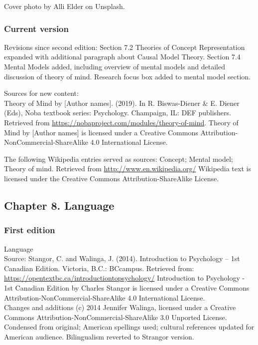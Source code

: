 \documentclass[
]{krantz}
\begin{document}
Cover photo by Alli Elder on Unsplash.

\subsubsection*{Current version}\label{current-version-2}


Revisions since second edition: Section 7.2 Theories of Concept Representation expanded with additional paragraph about Causal Model Theory. Section 7.4 Mental Models added, including overview of mental models and detailed discussion of theory of mind. Research focus box added to mental model section.

Sources for new content:\\
Theory of Mind by {[}Author names{]}. (2019). In R. Biswas-Diener \& E. Diener (Eds), Noba textbook series: Psychology. Champaign, IL: DEF publishers. Retrieved from \url{https://nobaproject.com/modules/theory-of-mind}.
Theory of Mind by {[}Author names{]} is licensed under a Creative Commons Attribution-NonCommercial-ShareAlike 4.0 International License.

The following Wikipedia entries served as sources: Concept; Mental model; Theory of mind. Retrieved from \url{http://www.en.wikipedia.org/}
Wikipedia text is licensed under the Creative Commons Attribution-ShareAlike License.

\subsection*{Chapter 8. Language}\label{chapter-8.-language}


\subsubsection*{First edition}\label{first-edition-8}


Language\\
Source: Stangor, C. and Walinga, J. (2014). Introduction to Psychology -- 1st Canadian Edition. Victoria, B.C.: BCcampus. Retrieved from: \url{https://opentextbc.ca/introductiontopsychology/}
Introduction to Psychology - 1st Canadian Edition by Charles Stangor is licensed under a Creative Commons Attribution-NonCommercial-ShareAlike 4.0 International License.\\
Changes and additions (c) 2014 Jennifer Walinga, licensed under a Creative Commons Attribution-NonCommercial-ShareAlike 3.0 Unported License.\\
Condensed from original; American spellings used; cultural references updated for American audience. Bilingualism reverted to Strangor version.
\end{document}

